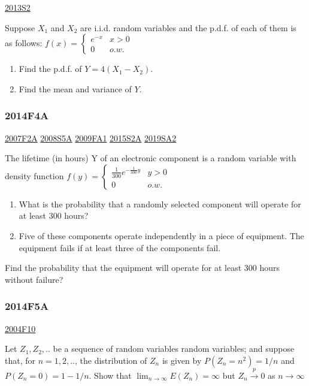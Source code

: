 \documentclass[6pt,Portrait]{article}
\begin{document}
\protect\hyperlink{s2-3}{2013S2}

Suppose \(X_1\) and \(X_2\) are i.i.d. random variables and the p.d.f.
of each of them is as follows:
\(f(x)=\begin{cases}e^{-x}& x>0\\0& o.w.\end{cases}\)

\begin{enumerate}
\def\labelenumi{(\alph{enumi})}
\item
  Find the p.d.f. of \(Y=4(X_1-X_2)\).
\item
  Find the mean and variance of \(Y\).
\end{enumerate}

\hypertarget{f4a-1}{%
\subsubsection{2014F4A}\label{f4a-1}}

\protect\hyperlink{f2a}{2007F2A} \protect\hyperlink{s5a}{2008S5A}
\protect\hyperlink{fa1}{2009FA1} \protect\hyperlink{s2a-1}{2015S2A}
\protect\hyperlink{sa2-3}{2019SA2}

The lifetime (in hours) Y of an electronic component is a random
variable with density function
\(f(y)=\begin{cases}\frac1{300}e^{-\frac1{300}y}& y>0\\0& o.w.\end{cases}\)

\begin{enumerate}
\def\labelenumi{(\alph{enumi})}
\item
  What is the probability that a randomly selected component will
  operate for at least 300 hours?
\item
  Five of these components operate independently in a piece of
  equipment. The equipment fails if at least three of the components
  fail.
\end{enumerate}

Find the probability that the equipment will operate for at least 300
hours without failure?

\hypertarget{f5a-1}{%
\subsubsection{2014F5A}\label{f5a-1}}

\protect\hyperlink{f10}{2004F10}

Let \(Z_1,Z_2,..\) be a sequence of random variables random variables;
and suppose that, for \(n=1,2,..\), the distribution of \(Z_n\) is given
by \(P(Z_n=n^2)=1/n\) and \(P(Z_n=0)=1-1/n\). Show that
\(\lim_{n\to\infty}E(Z_n)=\infty\) but \(Z_n\overset{p}\to0\) as
\(n\to\infty\)
\end{document}
